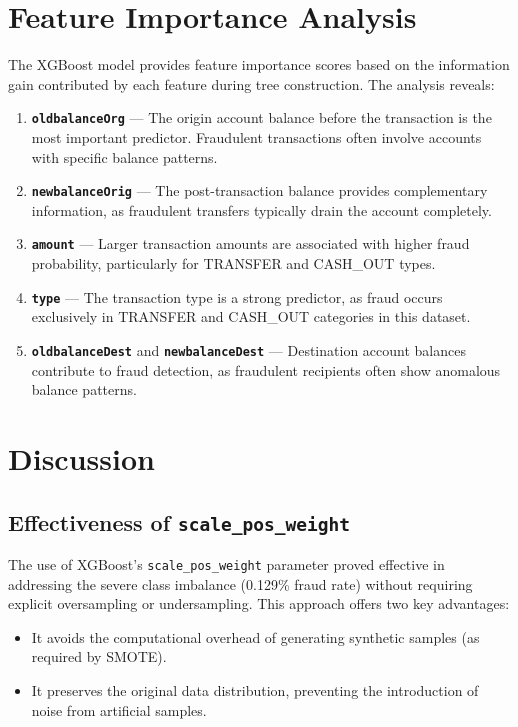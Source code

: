 \documentclass[12pt,a4paper]{report}
\begin{document}
\section{Feature Importance Analysis}

The XGBoost model provides feature importance scores based on the information gain contributed by each feature during tree construction. The analysis reveals:

\begin{enumerate}
    \item \textbf{\texttt{oldbalanceOrg}} — The origin account balance before the transaction is the most important predictor. Fraudulent transactions often involve accounts with specific balance patterns.
    \item \textbf{\texttt{newbalanceOrig}} — The post-transaction balance provides complementary information, as fraudulent transfers typically drain the account completely.
    \item \textbf{\texttt{amount}} — Larger transaction amounts are associated with higher fraud probability, particularly for TRANSFER and CASH\_OUT types.
    \item \textbf{\texttt{type}} — The transaction type is a strong predictor, as fraud occurs exclusively in TRANSFER and CASH\_OUT categories in this dataset.
    \item \textbf{\texttt{oldbalanceDest}} and \textbf{\texttt{newbalanceDest}} — Destination account balances contribute to fraud detection, as fraudulent recipients often show anomalous balance patterns.
\end{enumerate}

\section{Discussion}

\subsection{Effectiveness of \texttt{scale\_pos\_weight}}

The use of XGBoost's \texttt{scale\_pos\_weight} parameter proved effective in addressing the severe class imbalance (0.129\% fraud rate) without requiring explicit oversampling or undersampling. This approach offers two key advantages:
\begin{itemize}
    \item It avoids the computational overhead of generating synthetic samples (as required by SMOTE).
    \item It preserves the original data distribution, preventing the introduction of noise from artificial samples.
\end{itemize}
\end{document}
